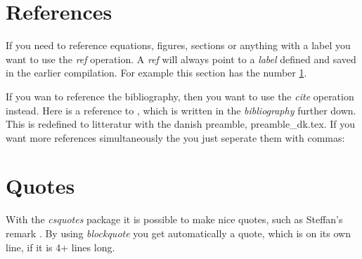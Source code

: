 \documentclass[a4, english]{article}
\begin{document}
\begin{figure}[htbp!]
    \centering
    \label{fig:ER}
\end{figure}

\section{References} \label{sec:ref}
If you need to reference equations, figures, sections or anything with a label you want to use the \emph{ref} operation. A \emph{ref} will always point to a \emph{label} defined and saved in the earlier compilation. For example this section has the number \ref{sec:ref}.

If you wan to reference the bibliography, then you want to use the \emph{cite} operation instead. Here is a reference to \cite{berlog}, which is written in the \emph{bibliography} further down. This is redefined to litteratur with the danish preamble, preamble\_dk.tex. If you want more references simultaneously the you just seperate them with commas: \cite{berlog, steffan}

\section{Quotes}
With the \emph{csquotes} package it is possible to make nice quotes, such as Steffan's remark . By using \emph{blockquote} you get automatically a quote, which is on its own line, if it is 4+ lines long.
\end{document}
